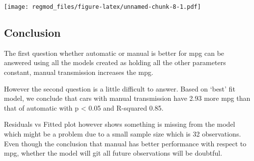 \documentclass[
]{article}
\begin{document}
\texttt{[image: regmod\_files/figure-latex/unnamed-chunk-8-1.pdf]}

\hypertarget{conclusion}{%
\subsection{Conclusion}\label{conclusion}}

The first question whether automatic or manual is better for mpg can be
answered using all the models created as holding all the other
parameters constant, manual transmission increases the mpg.

However the second question is a little difficult to answer. Based on
`best' fit model, we conclude that cars with manual transmission have
2.93 more mpg than that of automatic with p \textless{} 0.05 and
R-squared 0.85.

Residuals vs Fitted plot however shows something is missing from the
model which might be a problem due to a small sample size which is 32
observations. Even though the conclusion that manual has better
performance with respect to mpg, whether the model will git all future
observations will be doubtful.
\end{document}
